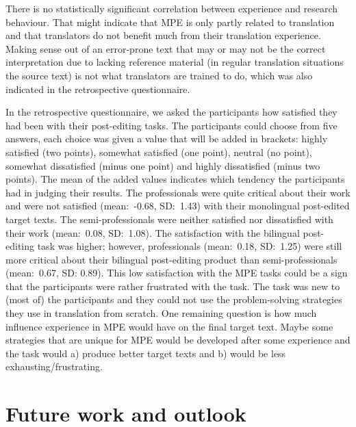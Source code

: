 \documentclass[output=paper]{langsci/langscibook}
\begin{document}
There is no statistically significant correlation between experience and research behaviour. That might indicate that MPE is only partly related to translation and that translators do not benefit much from their translation experience. Making sense out of an error-prone text that may or may not be the correct interpretation due to lacking reference material (in regular translation situations the source text) is not what translators are trained to do, which was also indicated in the retrospective questionnaire.



In the retrospective questionnaire, we asked the participants how satisfied they had been with their post-editing tasks. The participants could choose from five answers, each choice was given a value that will be added in brackets: highly satisfied (two points), somewhat satisfied (one point), neutral (no point), somewhat dissatisfied (minus one point) and highly dissatisfied (minus two points). The mean of the added values indicates which tendency the participants had in judging their results. The professionals were quite critical about their work and were not satisfied (mean:~-0.68, SD:~1.43) with their monolingual post-edited target texts. The semi-professionals were neither satisfied nor dissatisfied with their work (mean:~0.08, SD:~1.08). The satisfaction with the bilingual post-editing task was higher; however, professionals (mean:~0.18, SD:~1.25) were still more critical about their bilingual post-editing product than semi-professionals (mean:~0.67, SD: 0.89). This low satisfaction with the MPE tasks could be a sign that the participants were rather frustrated with the task. The task was new to (most of) the participants and they could not use the problem-solving strategies they use in translation from scratch. One remaining question is how much influence experience in MPE would have on the final target text. Maybe some strategies that are unique for MPE would be developed after some experience and the task would a) produce better target texts and b) would be less exhausting/frustrating.    


\section{Future work and outlook\label{nitzke:sec:FutureWorkAndOutlook}}
\end{document}
